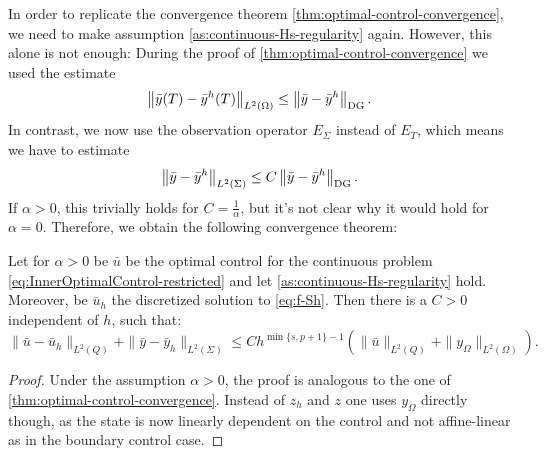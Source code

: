 \documentclass[../thesis.tex]{subfiles}
\begin{document}
In order to replicate the convergence theorem \cref{thm:optimal-control-convergence}, we need to make assumption \cref{as:continuous-Hs-regularity} again.
However, this alone is not enough: During the proof of \cref{thm:optimal-control-convergence} we used the estimate
\[
	\left\| \bar{y}(T) - \bar{y}^h(T) \right\|_{L^2(\Omega)} \leq \left\| \bar{y} - \bar{y}^h \right\|_{\mathrm{DG}}.
\]
In contrast, we now use the observation operator $E_\Sigma$ instead of $E_T$, which means we have to estimate
\[
	\left\| \bar{y} - \bar{y}^h \right\|_{L^2(\Sigma)} \leq C \left\| \bar{y} - \bar{y}^h \right\|_{\mathrm{DG}}.
\]
If $\alpha > 0$, this trivially holds for $C = \frac{1}{\alpha}$, but it's not clear why it would hold for $\alpha = 0$. Therefore, we obtain the following convergence theorem:
\begin{theorem}
Let for $\alpha > 0$ be $\bar{u}$ be the optimal control for the continuous problem \cref{eq:InnerOptimalControl-restricted} and let \cref{as:continuous-Hs-regularity} hold. Moreover, be $\bar{u}_h$ the discretized solution to \cref{eq:f-Sh}.
Then there is a $C > 0$ independent of $h$, such that:
\[
	\| \bar{u} - \bar{u}_h \|_{L^2(Q)} + \| \bar{y} - \bar{y}_h \|_{L^2(\Sigma)} \leq C h^{\min \{ s, p+1\} - 1} \left( \| \bar{u} \|_{L^2(Q)} + \| y_\Omega \|_{L^2(\Omega)} \right).
\]
\end{theorem}
\begin{proof}
Under the assumption $\alpha > 0$, the proof is analogous to the one of \cref{thm:optimal-control-convergence}. Instead of $z_h$ and $z$ one uses $y_\Omega$ directly though, as the state is now linearly dependent on the control and not affine-linear as in the boundary control case.
\end{proof}
\end{document}
